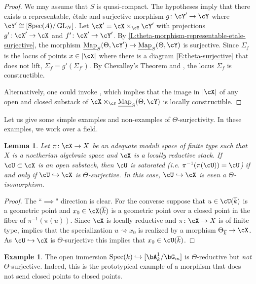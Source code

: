 \documentclass[a4paper]{amsart}
\numberwithin{equation}{section}
\theoremstyle{plain}
\newtheorem{lem}[thm]{Lemma}
\theoremstyle{definition}
\newtheorem{example}[thm]{Example}
\DeclareMathOperator{\Spec}{Spec}
\DeclareMathOperator{\GL}{GL}
\newcommand{\hookarr}{\hookrightarrow}
\newcommand{\uMap}{\underline{{\rm Map}}}
\newcommand{\co}{\colon}
\def\kbar{\overline{k}}
\begin{document}
\begin{proof}
	We may assume that $S$ is quasi-compact.
	The hypotheses imply that there exists a representable, \'etale and surjective morphism $g \co \cY' \to \cY$ where $\cY' \cong [\Spec(A) / \GL_N]$.
	Let $\cX' = \cX \times_{\cY} \cY'$ with projections  $g' \co \cX' \to \cX$ and $f' \co \cX' \to \cY'$.
	By \ref{L:theta-morphism-representable-etale-surjective}, the morphism $\uMap_S(\Theta,\cY') \to \uMap_S(\Theta,\cY)$ is surjective.
	Since $\Sigma_f$ is the locus of points $x \in |\cX|$ where there is a diagram \eqref{E:theta-surjective} that does not lift, $\Sigma_f = g'(\Sigma_{f'})$. By Chevalley's Theorem and , the locus $\Sigma_f$ is constructible.

Alternatively, one could invoke \cite[Lem.~4.4.8]{hlinstability}, which implies that the image in $|\cX|$ of any open and closed substack of $\cX \times_\cY \uMap_S(\Theta,\cY)$ is  locally constructible.
\end{proof}

Let us give some simple examples and non-examples of $\Theta$-surjectivity.  In these examples, we work over a field.

\begin{lem} \label{E:relative4} 
	Let $\pi \co \cX \to X$ be an adequate moduli space of finite type {such that $X$ is a noetherian algebraic space and $\cX$ is a} locally reductive stack.  If $\cU \subset \cX$ is an open substack, then $\cU$ is saturated (i.e. $\pi^{-1}(\pi(\cU)) = \cU$) if and only if $\cU \hookarr \cX$ is $\Theta$-surjective.  In this case, $\cU \hookarr \cX$ is even a $\Theta$-isomorphism. 
\end{lem}

\begin{proof}
The ``$\implies$" direction is clear.  {For the converse suppose that $u\in \cU(\kbar)$ is a geometric point and  $x_0\in \cX(\kbar)$ is a geometric point over a closed point in the  fiber of $\pi^{-1}(\pi(u))$. Since $\cX$ is locally reductive and $\pi \co \cX \to X$ is of finite type,  implies that the specialization $u \rightsquigarrow x_0$ is realized by a morphism $\Theta_{\kbar} \to \cX$. As $\cU\hookrightarrow \cX$ is $\Theta$-surjective this implies that $x_0\in \cU(\kbar)$.} 
\end{proof}

\begin{example} \label{E:relative1}
The open immersion $\Spec(k) \hookarr  [\bA_k^1 / \bG_m]$ is $\Theta$-reductive but \emph{not} $\Theta$-surjective.  Indeed, this is the prototypical example of a morphism that does not send closed points to closed points.
\end{example}
\end{document}
